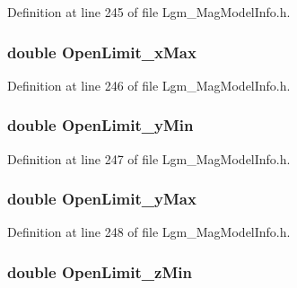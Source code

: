 Definition at line 245 of file Lgm\_\-MagModelInfo.h.\hypertarget{struct_lgm___mag_model_info_f97947f7418eed4c17c0668e8bc3cd4e}{
\subsubsection[{OpenLimit\_\-xMax}]{\setlength{\rightskip}{0pt plus 5cm}double {\bf OpenLimit\_\-xMax}}}
\label{struct_lgm___mag_model_info_f97947f7418eed4c17c0668e8bc3cd4e}




Definition at line 246 of file Lgm\_\-MagModelInfo.h.\hypertarget{struct_lgm___mag_model_info_97e8920e1c6dd24c5cff164113bf05b3}{
\subsubsection[{OpenLimit\_\-yMin}]{\setlength{\rightskip}{0pt plus 5cm}double {\bf OpenLimit\_\-yMin}}}
\label{struct_lgm___mag_model_info_97e8920e1c6dd24c5cff164113bf05b3}




Definition at line 247 of file Lgm\_\-MagModelInfo.h.\hypertarget{struct_lgm___mag_model_info_abc524710dd7b86daa257d70347b2c23}{
\subsubsection[{OpenLimit\_\-yMax}]{\setlength{\rightskip}{0pt plus 5cm}double {\bf OpenLimit\_\-yMax}}}
\label{struct_lgm___mag_model_info_abc524710dd7b86daa257d70347b2c23}




Definition at line 248 of file Lgm\_\-MagModelInfo.h.\hypertarget{struct_lgm___mag_model_info_f657d5c81e259de821321d7247c0a36d}{
\subsubsection[{OpenLimit\_\-zMin}]{\setlength{\rightskip}{0pt plus 5cm}double {\bf OpenLimit\_\-zMin}}}
\label{struct_lgm___mag_model_info_f657d5c81e259de821321d7247c0a36d}




